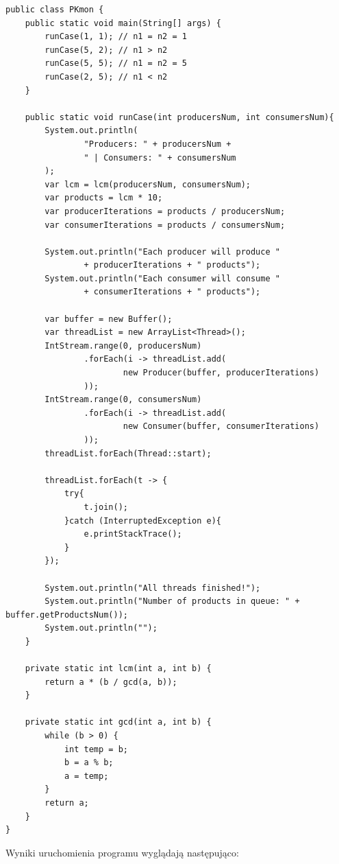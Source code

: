 \documentclass[12pt]{article}
\begin{document}
\begin{verbatim}
public class PKmon {
    public static void main(String[] args) {
        runCase(1, 1); // n1 = n2 = 1
        runCase(5, 2); // n1 > n2
        runCase(5, 5); // n1 = n2 = 5
        runCase(2, 5); // n1 < n2
    }

    public static void runCase(int producersNum, int consumersNum){
        System.out.println(
                "Producers: " + producersNum +
                " | Consumers: " + consumersNum
        );
        var lcm = lcm(producersNum, consumersNum);
        var products = lcm * 10;
        var producerIterations = products / producersNum;
        var consumerIterations = products / consumersNum;

        System.out.println("Each producer will produce "
                + producerIterations + " products");
        System.out.println("Each consumer will consume "
                + consumerIterations + " products");

        var buffer = new Buffer();
        var threadList = new ArrayList<Thread>();
        IntStream.range(0, producersNum)
                .forEach(i -> threadList.add(
                        new Producer(buffer, producerIterations)
                ));
        IntStream.range(0, consumersNum)
                .forEach(i -> threadList.add(
                        new Consumer(buffer, consumerIterations)
                ));
        threadList.forEach(Thread::start);

        threadList.forEach(t -> {
            try{
                t.join();
            }catch (InterruptedException e){
                e.printStackTrace();
            }
        });

        System.out.println("All threads finished!");
        System.out.println("Number of products in queue: " + buffer.getProductsNum());
        System.out.println("");
    }

    private static int lcm(int a, int b) {
        return a * (b / gcd(a, b));
    }

    private static int gcd(int a, int b) {
        while (b > 0) {
            int temp = b;
            b = a % b;
            a = temp;
        }
        return a;
    }
}
\end{verbatim}
%
\vspace{0.5cm}
Wyniki uruchomienia programu wyglądają następująco:
%
\end{document}
